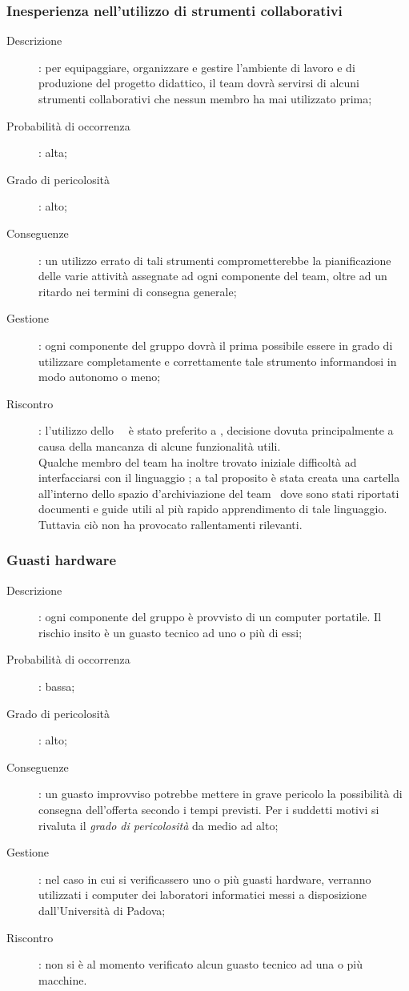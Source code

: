\documentclass[../PianoDiProgetto.tex]{subfiles}
\begin{document}
		\subsubsection{Inesperienza nell'utilizzo di strumenti collaborativi}
		\begin{description}
			\item [Descrizione]: per equipaggiare, organizzare e gestire l’ambiente di lavoro e di produzione del progetto didattico, il team dovrà servirsi di alcuni strumenti collaborativi che nessun membro ha mai utilizzato prima;
			\item [Probabilità di occorrenza]: alta;
			\item [Grado di pericolosità]: alto;
			\item [Conseguenze]: un utilizzo errato di tali strumenti comprometterebbe la pianificazione delle varie attività assegnate ad ogni componente del team, oltre ad un ritardo nei termini di consegna generale;
			\item [Gestione]: ogni componente del gruppo dovrà il prima possibile essere in grado di utilizzare completamente e  correttamente tale strumento informandosi in modo autonomo o meno;
			\item [Riscontro]: l'utilizzo dello \emph{}\ \emph{}\ è stato preferito a \emph{}, decisione dovuta principalmente a causa della mancanza di alcune funzionalità utili.\\
			Qualche membro del team ha inoltre trovato iniziale difficoltà ad interfacciarsi con il linguaggio \gl{\LaTeX}; a tal proposito è stata creata una cartella all'interno dello spazio d'archiviazione  del team \kpanic\ dove sono stati riportati documenti e guide utili al più rapido apprendimento di tale linguaggio.\\
			Tuttavia ciò non ha provocato rallentamenti rilevanti.
		\end{description}

		\subsubsection{Guasti hardware}
		\begin{description}
			\item [Descrizione]: ogni componente del gruppo è provvisto di un computer portatile. Il rischio insito è un guasto tecnico ad uno o più di essi;
			\item [Probabilità di occorrenza]: bassa;
			\item [Grado di pericolosità]: alto;
			\item [Conseguenze]: un guasto improvviso potrebbe mettere in grave pericolo la possibilità di consegna dell'offerta secondo i tempi previsti. Per i suddetti motivi si rivaluta il \emph{grado di pericolosità} da medio ad alto;
			\item [Gestione]: nel caso in cui si verificassero uno o più guasti hardware, verranno utilizzati i computer dei laboratori informatici messi a disposizione dall'Università di Padova;
			\item [Riscontro]: non si è al momento verificato alcun guasto tecnico ad una o più macchine.
		\end{description}		
	
\end{document}
